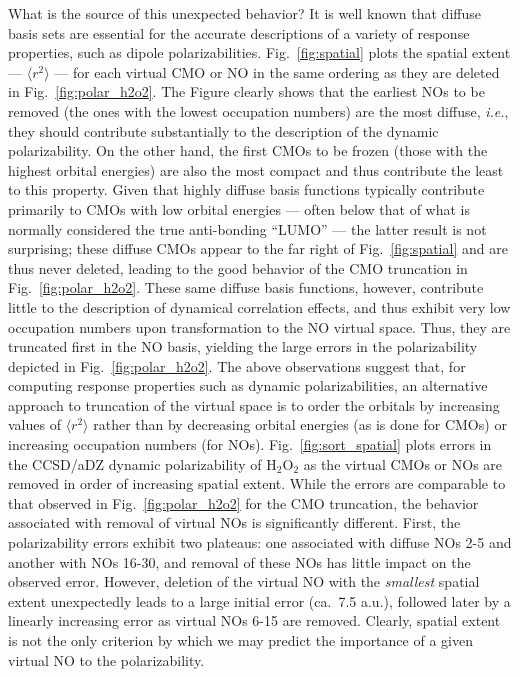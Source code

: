 \documentclass[11pt,article]{achemso}
\begin{document}
What is the source of this unexpected behavior?  It is well known that diffuse
basis sets are essential for the accurate descriptions of a variety of
response properties, such as dipole polarizabilities.  Fig.~\ref{fig:spatial}
plots the spatial extent --- $\langle r^2 \rangle$ --- for each virtual CMO or
NO in the same ordering as they are deleted in Fig.~\ref{fig:polar_h2o2}.  The
Figure clearly shows that the earliest NOs to be removed (the ones with the
lowest occupation numbers) are the most diffuse, {\em i.e.}, they should
contribute substantially to the description of the dynamic polarizability.  On
the other hand, the first CMOs to be frozen (those with the highest orbital
energies) are also the most compact and thus contribute the least to this
property.  Given that highly diffuse basis functions typically contribute
primarily to CMOs with low orbital energies --- often below that of what is
normally considered the true anti-bonding ``LUMO'' --- the latter result is
not surprising; these diffuse CMOs appear to the far right of
Fig.~\ref{fig:spatial} and are thus never deleted, leading to the good
behavior of the CMO truncation in Fig.~\ref{fig:polar_h2o2}.  These same
diffuse basis functions, however, contribute little to the description of
dynamical correlation effects, and thus exhibit very low occupation numbers
upon transformation to the NO virtual space.  Thus, they are truncated first
in the NO basis, yielding the large errors in the polarizability depicted in
Fig.~\ref{fig:polar_h2o2}.
The above observations suggest that, for computing response properties such as
dynamic polarizabilities, an alternative approach to truncation of the virtual
space is to order the orbitals by increasing values of $\langle r^2 \rangle$
rather than by decreasing orbital energies (as is done for CMOs) or increasing
occupation numbers (for NOs).  Fig.~\ref{fig:sort_spatial} plots errors in the
CCSD/aDZ dynamic polarizability of H$_2$O$_2$ as the virtual CMOs or NOs are
removed in order of increasing spatial extent.  While the errors are
comparable to that observed in Fig.~\ref{fig:polar_h2o2} for the CMO
truncation, the behavior associated with removal of virtual NOs is
significantly different.  First, the polarizability errors exhibit two
plateaus: one associated with diffuse NOs 2-5 and another with NOs 16-30, and
removal of these NOs has little impact on the observed error.  However,
deletion of the virtual NO with the {\em smallest} spatial extent unexpectedly
leads to a large initial error (ca.\ 7.5 a.u.), followed later by a linearly
increasing error as virtual NOs 6-15 are removed.  Clearly, spatial extent is
not the only criterion by which we may predict the importance of a given
virtual NO to the polarizability.
\end{document}
